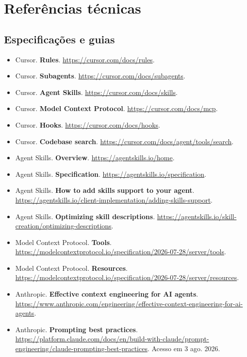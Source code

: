 \documentclass[
  10pt,
  a4paper,
  oneside]{book}
\providecommand{\tightlist}{%
  \setlength{\itemsep}{0pt}\setlength{\parskip}{0pt}}
\begin{document}
\normalsize

\newpage

\hypertarget{referuxeancias-tuxe9cnicas}{%
\chapter{Referências técnicas}\label{referuxeancias-tuxe9cnicas}}

\hypertarget{especificauxe7uxf5es-e-guias}{%
\section{Especificações e guias}\label{especificauxe7uxf5es-e-guias}}

\begin{itemize}
\tightlist
\item
  Cursor. \textbf{Rules}. \url{https://cursor.com/docs/rules}.
\item
  Cursor. \textbf{Subagents}. \url{https://cursor.com/docs/subagents}.
\item
  Cursor. \textbf{Agent Skills}. \url{https://cursor.com/docs/skills}.
\item
  Cursor. \textbf{Model Context Protocol}.
  \url{https://cursor.com/docs/mcp}.
\item
  Cursor. \textbf{Hooks}. \url{https://cursor.com/docs/hooks}.
\item
  Cursor. \textbf{Codebase search}.
  \url{https://cursor.com/docs/agent/tools/search}.
\item
  Agent Skills. \textbf{Overview}. \url{https://agentskills.io/home}.
\item
  Agent Skills. \textbf{Specification}.
  \url{https://agentskills.io/specification}.
\item
  Agent Skills. \textbf{How to add skills support to your agent}.
  \url{https://agentskills.io/client-implementation/adding-skills-support}.
\item
  Agent Skills. \textbf{Optimizing skill descriptions}.
  \url{https://agentskills.io/skill-creation/optimizing-descriptions}.
\item
  Model Context Protocol. \textbf{Tools}.
  \url{https://modelcontextprotocol.io/specification/2026-07-28/server/tools}.
\item
  Model Context Protocol. \textbf{Resources}.
  \url{https://modelcontextprotocol.io/specification/2026-07-28/server/resources}.
\item
  Anthropic. \textbf{Effective context engineering for AI agents}.
  \url{https://www.anthropic.com/engineering/effective-context-engineering-for-ai-agents}.
\item
  Anthropic. \textbf{Prompting best practices}.
  \url{https://platform.claude.com/docs/en/build-with-claude/prompt-engineering/claude-prompting-best-practices}.
  Acesso em 3 ago. 2026.
\end{itemize}
\end{document}
